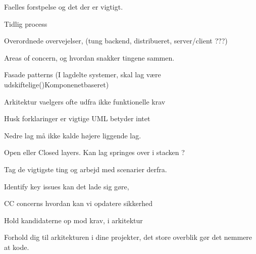 Faelles forstpelse og det der er vigtigt.

Tidlig process

Overordnede overvejelser, (tung backend, distribueret, server/client ???)

Areas of concern, og hvordan snakker tingene sammen.

Fasade patterns (I lagdelte systemer, skal lag være udskiftelige()Komponenetbaseret)

Arkitektur vaelgers ofte udfra ikke funktionelle krav

Husk forklaringer er vigtige UML betyder intet

Nedre lag må ikke kalde højere liggende lag.

Open eller Closed layers. Kan lag springes over i stacken ?



Tag de vigtigste ting og arbejd med scenarier derfra.


Identify key issues
kan det lade sig gøre, 

CC concerns hvordan kan vi opdatere sikkerhed 

Hold kandidaterne op mod krav, i arkitektur



Forhold dig til arkitekturen i dine projekter, det store overblik gør det nemmere at kode.
 


